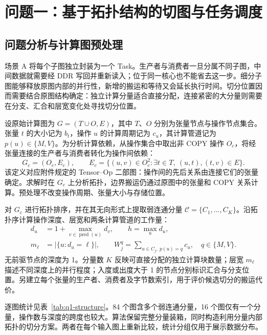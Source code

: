 \section{问题一：基于拓扑结构的切图与任务调度}

\subsection{问题分析与计算图预处理}
场景 A 将每个子图独立封装为一个 Task。生产者与消费者一旦分属不同子图，中间数据就需要经 DDR 写回并重新读入；位于同一核心也不能省去这一步。细分子图能够释放原图内部的并行性，新增的搬运和等待又会延长执行时间。切分位置因而需要结合原图结构确定：独立计算分量适合直接分配，连接紧密的大分量则需要在分支、汇合和层宽变化处寻找切分位置。

设原始计算图为 $G=(T\cup O,E)$，其中 $T$、$O$ 分别为张量节点与操作节点集合。张量 $t$ 的大小记为 $b_t$，操作 $u$ 的计算周期记为 $c_u$，其计算管道记为 $p(u)\in\{M,V\}$。为分析计算依赖，从操作集合中取出非 COPY 操作 $O_c$，将经张量连接的生产者与消费者转化为操作间依赖：
\begin{equation}
G_c=(O_c,E_c),\qquad
E_c=\{(u,v)\in O_c^2:\exists t\in T,\ (u,t),(t,v)\in E\}.
\label{eq:q1-opgraph}
\end{equation}
该定义对应附件规定的 Tensor--Op 二部图：操作间的先后关系由连接它们的张量确定。求解时在 $G_c$ 上分析拓扑，边界搬运仍通过原图中的张量和 COPY 关系计算。预处理不改变操作周期、张量大小与存储位置。

对 $G_c$ 进行拓扑排序，并在其无向形式上提取弱连通分量 $\mathcal C=\{C_1,\ldots,C_K\}$。沿拓扑序计算操作深度、层宽和两条计算管道的工作量：
\begin{equation}
\begin{aligned}
d_u&=1+\max_{v\in\operatorname{pred}(u)}d_v,\qquad h=\max_u d_u,\\
m_\ell&=|\{u:d_u=\ell\}|,\qquad
W_j^q=\sum_{u\in C_j,\ p(u)=q}c_u,\quad q\in\{M,V\}.
\end{aligned}
\label{eq:q1-features}
\end{equation}
无前驱节点的深度为 1。分量数 $K$ 反映可直接分配的独立计算块数量；层宽 $m_\ell$ 描述不同深度上的并行程度；入度或出度大于 1 的节点分别标识汇合与分支位置。另建立每个张量的生产者、消费者及字节数索引，用于评价候选切分的搬运代价。

逐图统计见表~\ref{tab:q1-structure}。84 个图含多个弱连通分量，16 个图仅有一个分量，操作数与深度的跨度也较大。算法保留完整分量装箱，同时构造利用分量内部拓扑的切分方案。两者在每个输入图上重新比较，统计分组仅用于展示数据分布。


